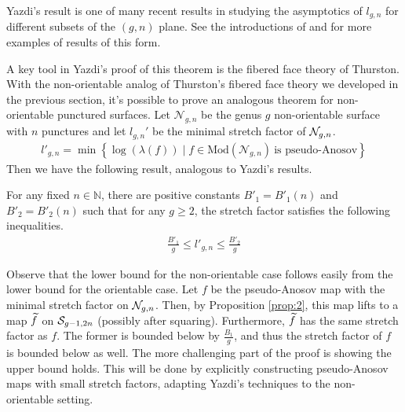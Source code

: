 Yazdi's result is one of many recent results in studying the asymptotics of $l_{g,n}$ for different subsets of
the $(g,n)$ plane. See the introductions of \cite{yazdi2018pseudo} and \cite{tsai2009asymptotic} for more
examples of results of this form. 




A key tool in Yazdi's proof of this theorem is the fibered face theory of Thurston. With the non-orientable analog of
Thurston's fibered face theory we developed in the previous section, it's possible to prove an analogous
theorem for non-orientable punctured surfaces.  Let $\mathcal{N}_{g,n}$ be the genus $g$ non-orientable
surface with $n$ punctures and let $l_{g,n}'$ be the minimal stretch factor of $\mathcal{N}_{g,n}$.
\begin{align*}
  l'_{g,n} = \min\left\{\log(\lambda(f)) \mid f \in \text{Mod}(\mathcal{N}_{g,n})\ \text{is pseudo-Anosov}\right\}
\end{align*}
Then we have the following result, analogous to Yazdi's results.
\begin{thm}
  \label{thm:stretch1}
  For any fixed $n \in \mathbb{N}$, there are positive constants $B'_1 = B'_1(n)$ and $B'_2 = B'_2(n)$ such that
  for any $g \geq 2$, the stretch factor satisfies the following inequalities.
  \begin{align*}
    \frac{B'_1}{g} \leq l'_{g,n} \leq \frac{B'_2}{g}
  \end{align*}
\end{thm}

Observe that the lower bound for the non-orientable case follows easily from the lower bound for the orientable case.
Let $f$ be the pseudo-Anosov map with the minimal stretch factor on $\mathcal{N}_{g,n}$. Then, by Proposition \ref{prop:2},
this map lifts to a map $\widetilde{f}$ on $\mathcal{S}_{g-1, 2n}$ (possibly after squaring). Furthermore, $\widetilde{f}$ has the same
stretch factor as $f$. The former is bounded below by $\frac{B_1}{g}$, and thus the stretch factor of $f$ is bounded
below as well. The more challenging part of the proof is showing the upper bound holds. This will be done by explicitly
constructing pseudo-Anosov maps with small stretch factors, adapting Yazdi's techniques to the non-orientable setting.

